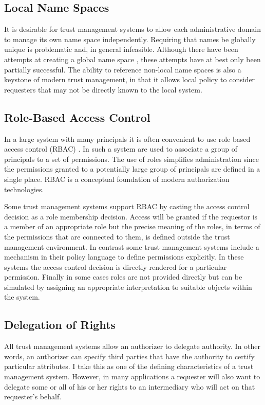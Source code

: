 \subsection{Local Name Spaces}

It is desirable for trust management systems to allow each administrative domain to manage its
own name space independently. Requiring that names be globally unique is problematic and, in
general infeasible. Although there have been attempts at creating a global name space
\cite{X500}, these attempts have at best only been partially successful. The ability to
reference non-local name spaces is also a keystone of modern trust management, in that it allows
local policy to consider requesters that may not be directly known to the local system.

\subsection{Role-Based Access Control}

In a large system with many principals it is often convenient to use role based access control
(RBAC) \cite{Ferraiolo:RBAC,Sandhu:RBACM}. In such a system  are used to
associate a group of principals to a set of permissions. The use of roles simplifies
administration since the permissions granted to a potentially large group of principals are
defined in a single place. RBAC is a conceptual foundation of modern authorization technologies.

Some trust management systems support RBAC by casting the access control decision as a role
membership decision. Access will be granted if the requestor is a member of an appropriate role
but the precise meaning of the roles, in terms of the permissions that are connected to them, is
defined outside the trust management environment. In contrast some trust management systems
include a mechanism in their policy language to define permissions explicitly. In these systems
the access control decision is directly rendered for a particular permission. Finally in some
cases roles are not provided directly but can be simulated by assigning an appropriate
interpretation to suitable objects within the system.

\subsection{Delegation of Rights}

All trust management systems allow an authorizer to delegate authority. In other words, an
authorizer can specify third parties that have the authority to certify particular attributes. I
take this as one of the defining characteristics of a trust management system. However, in many
applications a requester will also want to delegate some or all of his or her rights to an
intermediary who will act on that requester's behalf.

